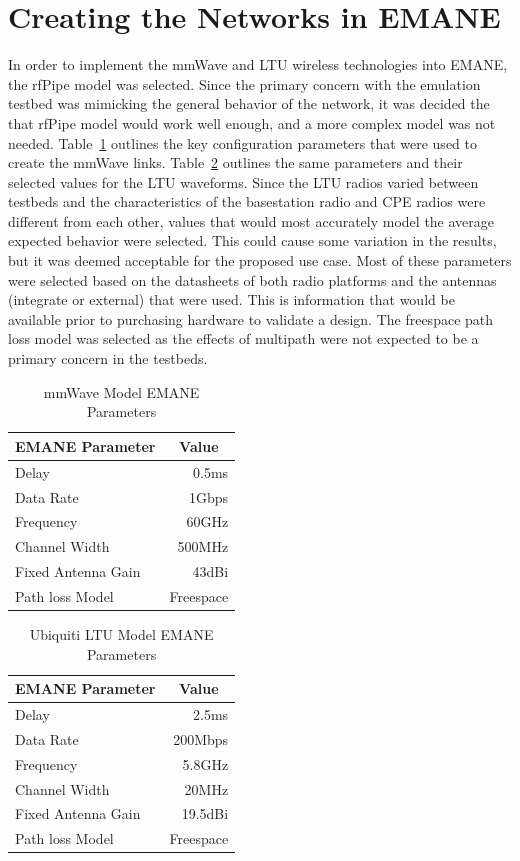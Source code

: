 \section{Creating the Networks in EMANE}
In order to implement the mmWave and LTU wireless technologies into EMANE, the rfPipe model was selected.
Since the primary concern with the emulation testbed was mimicking the general behavior of the network, it was decided the that rfPipe model would work well enough, and a more complex model was not needed.
Table~\ref{mmwave_params} outlines the key configuration parameters that were used to create the mmWave links.
Table~\ref{ltu_params} outlines the same parameters and their selected values for the LTU waveforms.
Since the LTU radios varied between testbeds and the characteristics of the basestation radio and CPE radios were different from each other, values that would most accurately model the average expected behavior were selected.
This could cause some variation in the results, but it was deemed acceptable for the proposed use case.
Most of these parameters were selected based on the datasheets of both radio platforms and the antennas (integrate or external) that were used.
This is information that would be available prior to purchasing hardware to validate a design.
The freespace path loss model was selected as the effects of multipath were not expected to be a primary concern in the testbeds.\par
\begin{table}[!ht]
\centering
\caption{mmWave Model EMANE Parameters}
\begin{tabular}{lr} 
\hline
\multicolumn{1}{c}{EMANE Parameter} & \multicolumn{1}{c}{Value} \\ 
\hline
Delay & 0.5ms \\
Data Rate & 1Gbps \\
Frequency & 60GHz \\
Channel Width & 500MHz \\
Fixed Antenna Gain & 43dBi \\
Path loss Model & \multicolumn{1}{l}{Freespace} \\
\hline
\end{tabular}
\label{mmwave_params}
\end{table}
\begin{table}[!ht]
\centering
\caption{Ubiquiti LTU Model EMANE Parameters}
\begin{tabular}{lr} 
\hline
\multicolumn{1}{c}{EMANE Parameter} & \multicolumn{1}{c}{Value} \\ 
\hline
Delay & 2.5ms \\
Data Rate & 200Mbps \\
Frequency & 5.8GHz \\
Channel Width & 20MHz \\
Fixed Antenna Gain & 19.5dBi \\
Path loss Model & \multicolumn{1}{l}{Freespace} \\
\hline
\end{tabular}
\label{ltu_params}
\end{table}
